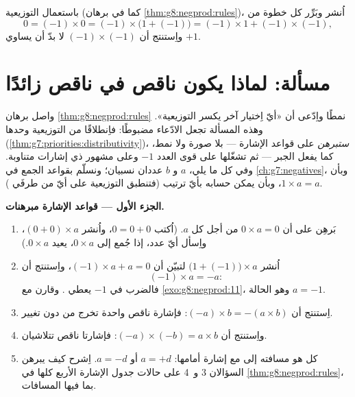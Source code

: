 \begin{exercise}[$\star\star\star$]\label{exo:g8:negprod:11}
باستعمال التوزيعية (كما في برهان
\cref{thm:g8:negprod:rules})، اُنشر وبَرِّر كل خطوة من
\[
0 = (-1) \times 0 = (-1) \times \bigl(1 + (-1)\bigr)
= (-1) \times 1 + (-1) \times (-1),
\]
واِستنتج أن $(-1) \times (-1)$ لا بدّ أن يساوي $+1$.
\end{exercise}

\section{مسألة: لماذا يكون ناقص في ناقص زائدًا}

\begin{problem}
\label{pb:g8:negprod:1}
واصل برهان \cref{thm:g8:negprod:rules} نمطًا
واِدّعى أن «أيّ اِختيار آخر يكسر التوزيعية». وهذه
المسألة تجعل الادّعاء مضبوطًا: فاِنطلاقًا من التوزيعية وحدها
(\cref{thm:g7:priorities:distributivity})، \emph{ستبرهن} على
قواعد الإشارة --- بلا صورة ولا نمط، كما يفعل الجبر ---
ثم تشغّلها على قوى العدد $-1$ وعلى  مشهور ذي
إشارات متناوبة. وفي كل ما يلي، $a$ و $b$ عددان نسبيان؛ ونسلّم
بقواعد الجمع في \cref{ch:g7:negatives}، وبأن
$1 \times a = a$، وبأن  يمكن حسابه بأيّ ترتيب
(فتنطبق التوزيعية على أيّ من طرفَي ).

\medskip
\noindent\textbf{الجزء الأول --- قواعد الإشارة مبرهنات.}
\begin{enumerate}
  \item بَرهِن على أن $0 \times a = 0$ من أجل كل  $a$.
        (اُكتب $0 = 0 + 0$، واُنشر $(0 + 0) \times a$، واِسأل أيّ
        عدد، إذا جُمع إلى $0 \times a$، يعيد $0 \times a$.)
  \item اُنشر $\bigl(1 + (-1)\bigr) \times a$ لتبيّن أن
        $(-1) \times a + a = 0$، واِستنتج أن
        \[
        (-1) \times a = -a :
        \]
        فالضرب في $-1$ يعطي . وقارن مع
        \cref{exo:g8:negprod:11}، وهو الحالة $a = -1$.
  \item اِستنتج أن $(-a) \times b = -(a \times b)$: فإشارة ناقص
        واحدة تخرج من  دون تغيير.
  \item واِستنتج أن $(-a) \times (-b) = a \times b$: فإشارتا ناقص
        تتلاشيان.
  \item كل  هو مسافته إلى  مع إشارة
        أمامها: $a = +d$ أو $a = -d$. اِشرح كيف يبرهن السؤالان 3 و~4
        على حالات جدول الإشارة الأربع كلها في
        \cref{thm:g8:negprod:rules}، بما فيها المسافات.
\end{enumerate}


\end{problem}
